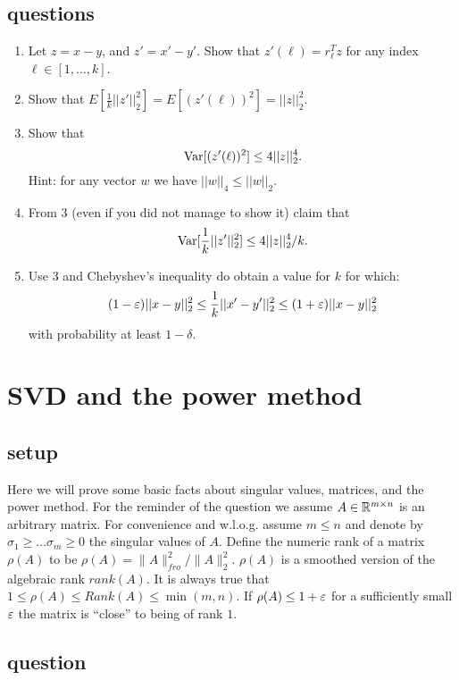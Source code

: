 \documentclass{article}
\begin{document}
\subsection*{questions}
\begin{enumerate}
\item Let $z = x-y$, and $z' = x' - y'$. Show that $z'(\ell) =
r_{\ell}^{T}z$ for any index $\ell \in [1,\ldots,k]$.

\item Show that $E[\frac{1}{k}||z'||_{2}^{2}] = E[(z'(\ell))^2] = ||z||_{2}^{2}$.
\item Show that
\[
{\operatorname{Var}}[(z'(\ell))^2] \le 4||z||_{2}^{4}.
\]
Hint: for any vector $w$ we have $||w||_4 \le ||w||_2$.
\item From 3 (even if you did not manage to show it) claim that
\[
{\operatorname{Var}}[\frac{1}{k}||z'||_{2}^{2}] \le 4||z||_{2}^{4}/k.
\]
\item Use 3 and Chebyshev's inequality do obtain a value for $k$
for which:
\[
(1-\varepsilon)||x-y||_{2}^{2} \le \frac{1}{k}||x' -y'||_{2}^{2} \le
(1+\varepsilon)||x-y||_{2}^{2}
\]
with probability at least $1-\delta$.
\end{enumerate}

\pagebreak

\section{SVD and the power method}
\subsection*{setup}

Here we will prove some basic facts about singular values, matrices, and the power method.
For the reminder of the question we assume $A \in {\mathbb{R}}^{m \times n}$ is an arbitrary matrix.
For convenience and w.l.o.g. assume $m \le n$ and denote by $\sigma_1 \ge \ldots \sigma_m \ge 0$
the singular values of $A$.
Define the numeric rank of a matrix $\rho(A)$ to be $\rho(A) = \|A\|^{2}_{fro}/\|A\|^2_2$. $\rho(A)$ is a smoothed
version of the algebraic rank $rank(A)$. It is always true that $1\le \rho(A) \le Rank(A) \le \min(m,n)$.
If $\rho(A) \le 1 +\varepsilon$ for a sufficiently small $\varepsilon$ the matrix is ``close'' to being of rank $1$.

\subsection*{question}
\end{document}
